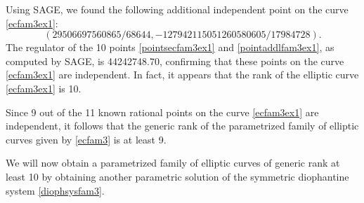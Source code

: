 \documentclass[11pt, leqno]{article}
\begin{document}
Using SAGE, we found the following additional independent point on the curve \eqref{ecfam3ex1}:
\begin{equation}
(29506697560865/68644, -127942115051260580605/17984728).\label{pointaddlfam3ex1}
\end{equation}
The regulator of the 10 points \eqref{pointsecfam3ex1} and \eqref{pointaddlfam3ex1}, as computed by SAGE, is 44242748.70, confirming that these points on the curve \eqref{ecfam3ex1} are independent. In fact, it appears that the rank of the elliptic curve \eqref{ecfam3ex1} is 10. 


 Since 9 out of the 11 known rational points on the curve \eqref{ecfam3ex1} are independent, it follows that the generic rank of the parametrized family of elliptic curves given by \eqref{ecfam3} is at least 9. 

We will now obtain a parametrized family of elliptic curves of generic rank at least 10 by obtaining another parametric solution of the symmetric diophantine system \eqref{diophsysfam3}. 
\end{document}
